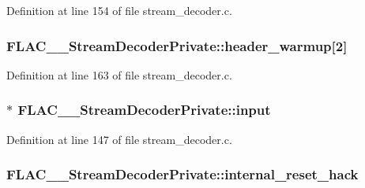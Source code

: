 Definition at line 154 of file stream\+\_\+decoder.\+c.

\subsubsection[{\texorpdfstring{header\+\_\+warmup}{header_warmup}}]{ F\+L\+A\+C\+\_\+\+\_\+\+Stream\+Decoder\+Private\+::header\+\_\+warmup\mbox{[}2\mbox{]}}\hypertarget{struct_f_l_a_c_____stream_decoder_private_a91bc66ef904d099020ddc6f8ecfe5c8c}{}\label{struct_f_l_a_c_____stream_decoder_private_a91bc66ef904d099020ddc6f8ecfe5c8c}


Definition at line 163 of file stream\+\_\+decoder.\+c.

\subsubsection[{\texorpdfstring{input}{input}}]{$\ast$ F\+L\+A\+C\+\_\+\+\_\+\+Stream\+Decoder\+Private\+::input}\hypertarget{struct_f_l_a_c_____stream_decoder_private_a40ead9252a794c6549f78cfd52ffb536}{}\label{struct_f_l_a_c_____stream_decoder_private_a40ead9252a794c6549f78cfd52ffb536}


Definition at line 147 of file stream\+\_\+decoder.\+c.

\subsubsection[{\texorpdfstring{internal\+\_\+reset\+\_\+hack}{internal_reset_hack}}]{ F\+L\+A\+C\+\_\+\+\_\+\+Stream\+Decoder\+Private\+::internal\+\_\+reset\+\_\+hack}\hypertarget{struct_f_l_a_c_____stream_decoder_private_a55f163ead76abb029c6ab856d8012e7e}{}\label{struct_f_l_a_c_____stream_decoder_private_a55f163ead76abb029c6ab856d8012e7e}


